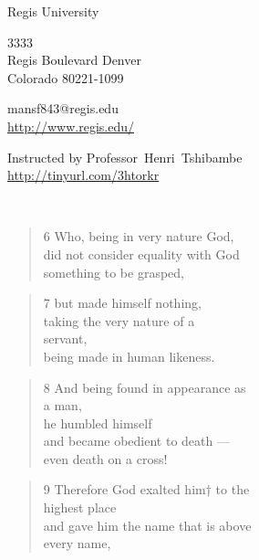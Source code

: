 \documentclass[11pt,a4paper]{scrartcl} %
\begin{document}
\pagecolor{Sepia!04}
\begin{cv}{}
        \begin{cvlist}{\textcolor{brown}{}}\label{PersDat}  
            \item   Regis University
            \item   3333\\
                    Regis Boulevard Denver \\	
                    Colorado 80221-1099
            \item   mansf843@regis.edu\\				
                    \url{http://www.regis.edu/}				
        \end{cvlist}
        \begin{cvlist}{}\label{irgendwas}
            \item Instructed by Professor~Henri~Tshibambe\\
             \url{http://tinyurl.com/3htorkr}
        \end{cvlist}
    \end{cv}
\clearpage
\noindent
\begin{center}
\textcolor{Maroon}{}\\
\textcolor{brown}{}
\end{center}
\begin{verse}
6 Who, being in very nature God, \\ did not consider equality with God \\ something to be grasped, 
\end{verse}
\begin{verse}
7 but made himself nothing,\\ taking the very nature of a\\ servant, \\ being made in human likeness.
\end{verse}
\begin{verse}
8 And being found in appearance as\\ a man,\\he humbled himself\\ and became obedient to death —\\ even death on a cross!
\end{verse}
\begin{verse}
9 Therefore God exalted him† to the\\ highest place\\ and gave him the name that is above\\ every name,
\end{verse}
\end{document}
